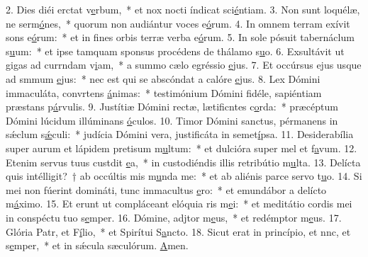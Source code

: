 2. Dies diéi erctat v\uline{e}rbum,~* et nox nocti índicat sci\uline{é}ntiam.
3. Non sunt loquélæ, ne serm\uline{ó}nes,~* quorum non audiántur voces e\uline{ó}rum.
4. In omnem terram exívit sons e\uline{ó}rum:~* et in fines orbis terræ verba e\uline{ó}rum.
5. In sole pósuit tabernáclum s\uline{u}um:~* et ipse tamquam sponsus procédens de thálamo s\uline{u}o.
6. Exsultávit ut gigas ad currndam v\uline{i}am,~* a summo cælo egréssio \uline{e}jus.
7. Et occúrsus ejus usque ad smmum \uline{e}jus:~* nec est qui se abscóndat a calóre \uline{e}jus.
8. Lex Dómini immaculáta, convrtens \uline{á}nimas:~* testimónium Dómini fidéle, sapiéntiam præstans p\uline{á}rvulis.
9. Justítiæ Dómini rectæ, lætificntes c\uline{o}rda:~* præcéptum Dómini lúcidum illúminans \uline{ó}culos.
10. Timor Dómini sanctus, pérmanens in sǽclum s\uline{ǽ}culi:~* judícia Dómini vera, justificáta in semet\uline{í}psa.
11. Desiderabília super aurum et lápidem pretisum m\uline{u}ltum:~* et dulcióra super mel et f\uline{a}vum.
12. Etenim servus tuus custdit \uline{e}a,~* in custodiéndis illis retribútio m\uline{u}lta.
13. Delícta quis intélligit?~† ab occúltis mis m\uline{u}nda me:~* et ab aliénis parce servo t\uline{u}o.
14. Si mei non fúerint domináti, tunc immacultus \uline{e}ro:~* et emundábor a delícto m\uline{á}ximo.
15. Et erunt ut compláceant elóquia ris m\uline{e}i:~* et meditátio cordis mei in conspéctu tuo s\uline{e}mper.
16. Dómine, adjtor m\uline{e}us,~* et redémptor m\uline{e}us.
17. Glória Patr, et F\uline{í}lio,~* et Spirítui S\uline{a}ncto.
18. Sicut erat in princípio, et nnc, et s\uline{e}mper,~* et in sǽcula sæculórum. \uline{A}men.
